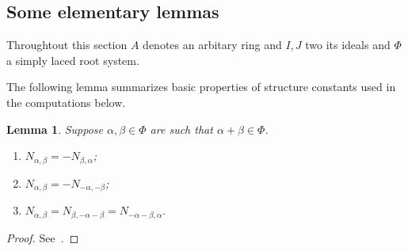 \documentclass[oneside, 8pt]{amsart}
\newtheorem{lemma}{Lemma}
\theoremstyle{remark}
\theoremstyle{definition}
\DeclareMathOperator{\St}{St}
\numberwithin{equation}{section}
\begin{document}
\subsection{Some elementary lemmas}
\begin{comment}
The following result was proved in \cite[Proposition~3.2]{Ste13}.
\begin{lemma}\label{lem:Zgen} Let $\Phi$ be an irreducible root system of rank $\geq 2$. 
Let $G$ denote the normal closure in $\St(\Phi, R)$ of the subgroup spanned by elementary root unipotents of level $I$, i.\,e. $G=\langle x_\alpha(s) \mid \alpha\in\Phi,\ s\in I\rangle^{\St(\Phi, R)}$.

Let $S$ be a parabolic set of roots of $\Phi$ with special part $\Sigma_S$. Then $G$ is generated as an abstract group by the set $\mathcal{Z}(\Sigma_S, I, R)$ consisting of the following two families of elements:
\begin{itemize}
 \item $x_{\alpha}(s)$, where $s\in I$, $\alpha\in\Phi$;
 \item $z_\alpha(s,\xi)$, where $s\in I$, $\xi\in R$, $\alpha\in\Sigma_S$.
\end{itemize}        
\end{lemma}
\end{comment}

\begin{comment}
Hall-Witt identity
\[ [[ y^{-1}, x], z] ^ {y^{-1}}  [[ z^{-1}, y], x] ^ {z^{-1}}  [[ x^{-1}, z], y] ^ {x^{-1}} = 1 \]
\[ [[ y^{-1}, x], z]  \cdot [[ z^{-1}, y], x] ^ {z^{-1}y} \cdot  [[ x^{-1}, z], y] ^ {x^{-1}y} = 1. \]
\[ [[ z^{-1}, y^{-1}], x] ^ {z^{-1}y^{-1}} \cdot  [[ x^{-1}, z], y^{-1}] ^ {x^{-1}y^{-1}} = [z, [ y, x]] . \]
\[  . \]
\end{comment}
Throughtout this section $A$ denotes an arbitary ring and $I, J$ two its ideals and $\Phi$ a simply laced root system.

The following lemma summarizes basic properties of structure constants used in the computations below.
\begin{lemma} Suppose $\alpha, \beta \in \Phi$ are such that $\alpha+\beta \in \Phi$.
\begin{enumerate}\label{lem:structure-constants}
 \item $N_{\alpha, \beta} = -N_{\beta,\alpha}$;
 \item $N_{\alpha, \beta} = - N_{-\alpha, -\beta}$;
 \item $N_{\alpha, \beta} = N_{\beta, -\alpha-\beta} = N_{-\alpha-\beta, \alpha}.$
\end{enumerate}
\end{lemma}
\begin{proof} See~\cite[\S~14]{VP}. \end{proof}
\end{document}
